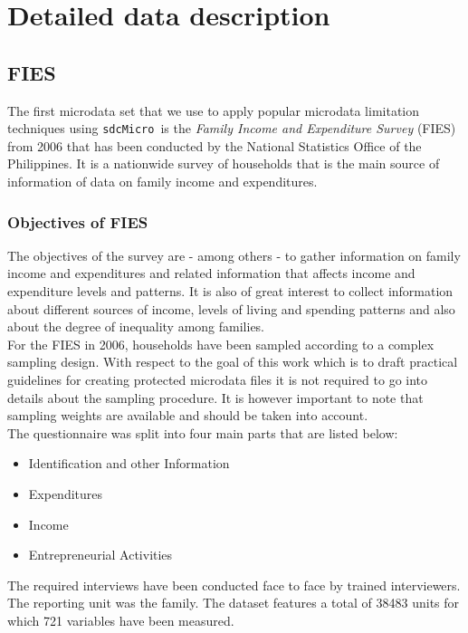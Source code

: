 \documentclass[12pt]{article}
\newcommand{\sdcMicro}{\texttt{sdcMicro}}
\begin{document}
\section{Detailed data description} \label{annex:data} \label{appA}

\subsection{FIES}\label{data:fies}
The first microdata set that we use to apply popular microdata limitation techniques using 
\sdcMicro~is the \textit{Family Income and Expenditure Survey} (FIES) from 2006 
that has been conducted by the National Statistics Office of the Philippines. 
It is a nationwide survey of households that is the main source of information of data on 
family income and expenditures. \\

\subsubsection{Objectives of FIES}
The objectives of the survey are - among others - to gather information on family income and 
expenditures and related information that affects income and expenditure levels and patterns. 
It is also of great interest to collect information about different sources of income, 
levels of living and spending patterns and also about the degree of inequality among families. \\

For the FIES in 2006, households have been sampled according to a complex sampling design. With respect to the goal of this work which is to draft practical guidelines for creating protected microdata files it is not required to go into details about
the sampling procedure. It is however important to note that sampling weights are available and should be taken into account. \\

The questionnaire was split into four main parts that are listed below:
\begin{itemize}	
	\setlength{\itemsep}{-1mm}
	\item Identification and other Information
	\item Expenditures
	\item Income
	\item Entrepreneurial Activities
\end{itemize}

The required interviews have been conducted face to face by trained interviewers. The reporting unit was the family.
The dataset 
features a total of 38483 units for which 721 variables have been measured.
\end{document}
